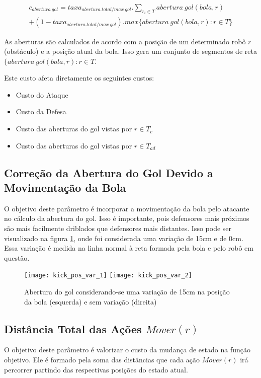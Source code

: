 \begin{multline} 
 c_{abertura{\ }gol} = taxa_{abertura{\ }total/max{\ }gol} .
   \sum_{r_i \in T} abertura{\ }gol(bola, r)\\
   + (1 - taxa_{abertura{\ }total/max{\ }gol}) .
   max \lbrace abertura{\ }gol(bola, r): r \in T \rbrace 
\end{multline}

As aberturas são calculados de acordo com a posição de um determinado robô $r$ (obstáculo)
e a posição atual da bola. Isso gera um conjunto de segmentos de reta
$\lbrace abertura{\ }gol(bola, r): r \in T $.

Este custo afeta diretamente os seguintes custos:
\begin{itemize}
  \item Custo do Ataque
  \item Custo da Defesa
  \item Custo das aberturas do gol vistas por $r\in T_c$
  \item Custo das aberturas do gol vistas por $r\in T_{ad}$
\end{itemize}

\subsection{Correção da Abertura do Gol Devido a Movimentação da Bola} 
O objetivo deste parâmetro é incorporar a movimentação
da bola pelo atacante no cálculo da abertura do gol. Isso é importante,
pois defensores mais
próximos são mais facilmente driblados que defensores mais distantes. Isso
pode ser visualizado na figura \ref{fig:kick_pos}, onde foi considerada
uma variação de 15cm e de 0cm. Essa variação é medida na linha normal
à reta formada pela bola e pelo robô em questão.


\begin{figure}[H]
  \centering
  \texttt{[image: kick\_pos\_var\_1]}
  \texttt{[image: kick\_pos\_var\_2]}
  \caption{Abertura do gol considerando-se uma variação de 15cm na 
           posição da bola (esquerda) e sem variação (direita)}\label{fig:kick_pos}
\end{figure}


\subsection{Distância Total das Ações $Mover(r)$} 
O objetivo deste parâmetro é valorizar o custo da
mudança de estado na função objetivo. Ele é formado pela soma das
distâncias que cada ação $Mover(r)$ irá percorrer partindo das
respectivas posições do estado atual.

